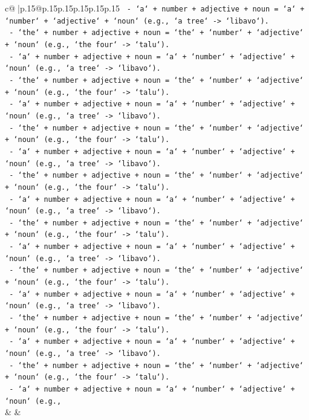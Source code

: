 \documentclass{article}
\begin{document}
{\begin{supertabular}{c@{$\;$}|p{.15\linewidth}@{}p{.15\linewidth}p{.15\linewidth}p{.15\linewidth}p{.15\linewidth}p{.15\linewidth}}
{{{\texttt{   {-} `a` + number + adjective + noun = `a` + `number` + `adjective` + `noun` (e.g., `a tree` {-}> `libavo`).} \\
\texttt{   {-} `the` + number + adjective + noun = `the` + `number` + `adjective` + `noun` (e.g., `the four` {-}> `talu`).} \\
\texttt{   {-} `a` + number + adjective + noun = `a` + `number` + `adjective` + `noun` (e.g., `a tree` {-}> `libavo`).} \\
\texttt{   {-} `the` + number + adjective + noun = `the` + `number` + `adjective` + `noun` (e.g., `the four` {-}> `talu`).} \\
\texttt{   {-} `a` + number + adjective + noun = `a` + `number` + `adjective` + `noun` (e.g., `a tree` {-}> `libavo`).} \\
\texttt{   {-} `the` + number + adjective + noun = `the` + `number` + `adjective` + `noun` (e.g., `the four` {-}> `talu`).} \\
\texttt{   {-} `a` + number + adjective + noun = `a` + `number` + `adjective` + `noun` (e.g., `a tree` {-}> `libavo`).} \\
\texttt{   {-} `the` + number + adjective + noun = `the` + `number` + `adjective` + `noun` (e.g., `the four` {-}> `talu`).} \\
\texttt{   {-} `a` + number + adjective + noun = `a` + `number` + `adjective` + `noun` (e.g., `a tree` {-}> `libavo`).} \\
\texttt{   {-} `the` + number + adjective + noun = `the` + `number` + `adjective` + `noun` (e.g., `the four` {-}> `talu`).} \\
\texttt{   {-} `a` + number + adjective + noun = `a` + `number` + `adjective` + `noun` (e.g., `a tree` {-}> `libavo`).} \\
\texttt{   {-} `the` + number + adjective + noun = `the` + `number` + `adjective` + `noun` (e.g., `the four` {-}> `talu`).} \\
\texttt{   {-} `a` + number + adjective + noun = `a` + `number` + `adjective` + `noun` (e.g., `a tree` {-}> `libavo`).} \\
\texttt{   {-} `the` + number + adjective + noun = `the` + `number` + `adjective` + `noun` (e.g., `the four` {-}> `talu`).} \\
\texttt{   {-} `a` + number + adjective + noun = `a` + `number` + `adjective` + `noun` (e.g., `a tree` {-}> `libavo`).} \\
\texttt{   {-} `the` + number + adjective + noun = `the` + `number` + `adjective` + `noun` (e.g., `the four` {-}> `talu`).} \\
\texttt{   {-} `a` + number + adjective + noun = `a` + `number` + `adjective` + `noun` (e.g.,} \\
            }
        }
    }
    & & \\ \\


\end{supertabular}}
\end{document}
